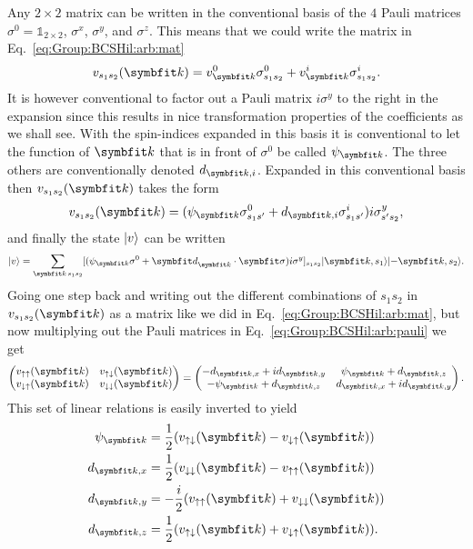 Any $2\times 2$ matrix can be written in the conventional basis of the $4$ Pauli matrices $\sigma^0 = \mathbb{1}_{2\times 2}$, $\sigma^x$, $\sigma^y$,
and $\sigma^z$. This means that we could write the matrix in Eq.~\eqref{eq:Group:BCSHil:arb:mat}
\begin{equation}
    \label{eq:GroupBCSHil:arb:pauliExp}
    v_{s_1s_2}(\v{k}) = v^0_\v{k}\sigma^0_{s_1s_2} + v^i_\v{k}\sigma^i_{s_1s_2}.
\end{equation}
It is however conventional to factor out a Pauli matrix $i\sigma^y$ to the right in the expansion since this results in nice transformation properties
of the coefficients as we shall see.
With the spin-indices expanded in this basis it is conventional to let the function of $\v{k}$
that is in front of $\sigma^0$ be called $\psi_\v{k}$. The three others are conventionally denoted $d_{\v{k},i}$. Expanded in this conventional basis
then $v_{s_1s_2}(\v{k})$ takes the form
\begin{equation}
    \label{eq:Group:BCSHil:arb:pauli}
    v_{s_1s_2}(\v{k}) = (\psi_\v{k}\sigma^0_{s_1s'} + d_{\v{k},i}\sigma^i_{s_1s'})i\sigma^y_{s's_2},
\end{equation}
and finally the state $\lvert v \rangle$ can be written
\begin{equation}
    \label{eq:Group:BCSHil:arb:ket}
    \ket{v} = \sum_{\v{k}\,s_1s_2}[(\psi_\v{k}\sigma^0 + \v{d}_\v{k}\cdot\v{\sigma})i\sigma^y]_{s_1s_2}\ket{\v{k},s_1}\ket{-\v{k},s_2}.
\end{equation}
Going one step back and writing out the different combinations of $s_1s_2$ in $v_{s_1s_2}(\v{k})$ as a matrix like we did in
Eq.~\eqref{eq:Group:BCSHil:arb:mat}, but now multiplying out the Pauli matrices in Eq.~\eqref{eq:Group:BCSHil:arb:pauli} we get
\begin{equation}
    \label{eq:Group:BCSHil:arb:mat:Pauli}
    \begin{pmatrix}
        v_{\up\up}(\v{k}) & v_{\up\dn}(\v{k})\\
        v_{\dn\up}(\v{k}) & v_{\dn\dn}(\v{k})
    \end{pmatrix} =
    \begin{pmatrix}
        -d_{\v{k},x}+id_{\v{k},y} & \psi_\v{k}+d_{\v{k},z}\\
        -\psi_\v{k}+d_{\v{k},z} & d_{\v{k},x}+id_{\v{k},y}
    \end{pmatrix}.
\end{equation}
This set of linear relations is easily inverted to yield
\begin{align}
    \label{eq:Group:BCSHil:arb:inverseRel:psi}
    \psi_\v{k} &= \frac{1}{2}(v_{\up\dn}(\v{k}) - v_{\dn\up}(\v{k}))\\
    \label{eq:Group:BCSHil:arb:inverseRel:dx}
    d_{\v{k},x} &= \frac{1}{2}(v_{\dn\dn}(\v{k})-v_{\up\up}(\v{k}))\\
    \label{eq:Group:BCSHil:arb:inverseRel:dy}
    d_{\v{k},y} &= -\frac{i}{2}(v_{\up\up}(\v{k})+v_{\dn\dn}(\v{k}))\\
    \label{eq:Group:BCSHil:arb:inverseRel:dz}
    d_{\v{k},z} &= \frac{1}{2}(v_{\up\dn}(\v{k})+v_{\dn\up}(\v{k})).
\end{align}

